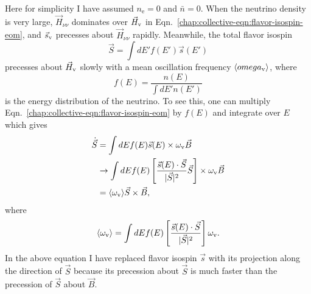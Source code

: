 Here for simplicity I have assumed $n_{\mathrm e}=0$ and $\bar n=0$. When the neutrino density is very large, $\vec H_{\nu\nu}$ dominates over $\vec H_\mathrm v$ in Eqn.~\ref{chap:collective-eqn:flavor-isospin-eom}, and $\vec s_\mathrm v$ precesses about $\vec H_{\nu\nu}$ rapidly. Meanwhile, the total flavor isospin
\begin{equation}
    \vec S = \int d E' f(E') \vec s(E')
\end{equation}
precesses about $\vec H_\mathrm v$ slowly with a mean oscillation frequency $\langle omega_\mathrm v \rangle$, where
\begin{equation}
    f(E) = \frac{ n(E) }{ \int dE' n(E') }
\end{equation}
is the energy distribution of the neutrino. To see this, one can multiply Eqn.~\ref{chap:collective-eqn:flavor-isospin-eom} by $f(E)$ and integrate over $E$ which gives
\begin{align}
    \dot{\vec S} &= \int dE f(E)\vec s(E) \times \omega_\mathrm v \vec B \\
    &\to \int dE f(E) \left[ \frac{\vec s(E) \cdot \vec S}{ \lvert \vec S \rvert^2 } \vec S \right] \times \omega_\mathrm v \vec B \\
    &= \langle \omega_\mathrm v \rangle \vec S \times \vec B,
\end{align}
where
\begin{equation}
    \langle \omega_\mathrm v \rangle  = \int dE f(E) \left[ \frac{\vec s(E) \cdot \vec S}{ \lvert \vec S \rvert^2 } \right] \omega_\mathrm v.
\end{equation}
In the above equation I have replaced flavor isospin $\vec s$ with its projection along the direction of $\vec S$ because its precession about $\vec S$ is much faster than the precession of $\vec S$ about $\vec B$.


